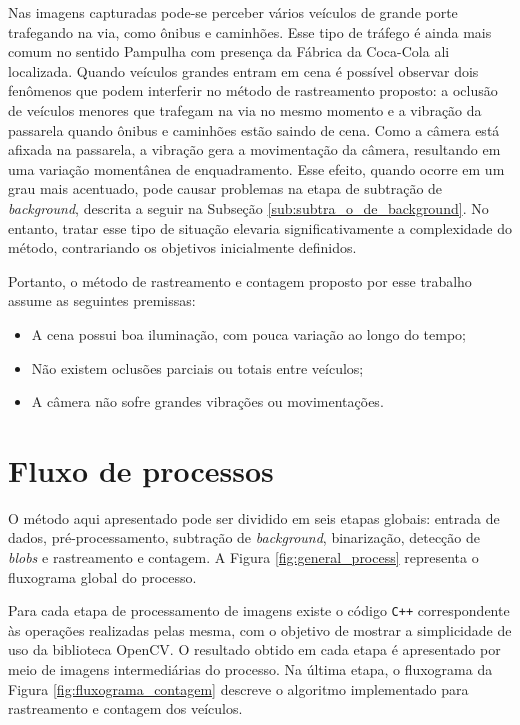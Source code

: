 Nas imagens capturadas pode-se perceber vários veículos de grande porte trafegando na via, como ônibus e caminhões. Esse tipo de tráfego é ainda mais comum no sentido Pampulha com presença da Fábrica da Coca-Cola ali localizada. Quando veículos grandes entram em cena é possível observar dois fenômenos que podem interferir no método de rastreamento proposto: a oclusão de veículos menores que trafegam na via no mesmo momento e a vibração da passarela quando ônibus e caminhões estão saindo de cena. Como a câmera está afixada na passarela, a vibração gera a movimentação da câmera, resultando em uma variação momentânea de enquadramento. Esse efeito, quando ocorre em um grau mais acentuado, pode causar problemas na etapa de subtração de \textit{background}, descrita a seguir na Subseção \ref{sub:subtra_o_de_background}. No entanto, tratar esse tipo de situação elevaria significativamente a complexidade do método, contrariando os objetivos inicialmente definidos.

Portanto, o método de rastreamento e contagem proposto por esse trabalho assume as seguintes premissas:

\begin{itemize}
   \item A cena possui boa iluminação, com pouca variação ao longo do tempo;
   \item Não existem oclusões parciais ou totais entre veículos;
   \item A câmera não sofre grandes vibrações ou movimentações.
 \end{itemize} 


\section{Fluxo de processos} %
\label{sec:fluxo_de_processos}

O método aqui apresentado pode ser dividido em seis etapas globais: entrada de dados, pré-processamento, subtração de \textit{background}, binarização, detecção de \textit{blobs} e rastreamento e contagem. A Figura \ref{fig:general_process} representa o fluxograma global do processo.

Para cada etapa de processamento de imagens existe o código \verb!C++! correspondente às operações realizadas pelas mesma, com o objetivo de mostrar a simplicidade de uso da biblioteca OpenCV. O resultado obtido em cada etapa é apresentado por meio de imagens intermediárias do processo. Na última etapa, o fluxograma da Figura \ref{fig:fluxograma_contagem} descreve o algoritmo implementado para rastreamento e contagem dos veículos.

